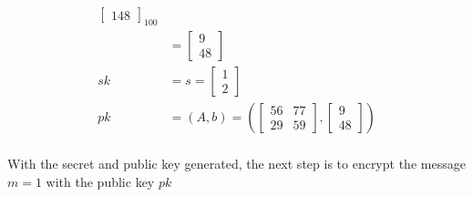 \begin{align*}
\begin{bmatrix}
           148\end{bmatrix}_{100}                   \\
     & = \begin{bmatrix}
           9 \\ 
           48 
         \end{bmatrix}                           \\
  sk & = s =  \begin{bmatrix}1 \\ 2 \end{bmatrix} \\
  pk & = (A, b) = \left (
  \begin{bmatrix}
      56 & 77  \\
      29 & 59 
    \end{bmatrix},
  \begin{bmatrix}
      9 \\
      48 
    \end{bmatrix} \right )                          \\
\end{align*}

With the secret and public key generated, the next step is to encrypt the message $m=1$ with the public key $pk$

